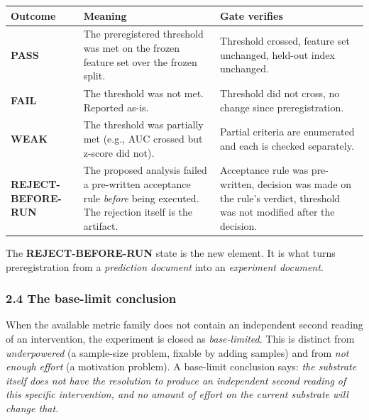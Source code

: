 \documentclass[
]{article}
\newcounter{none} %
\begin{document}
{\def\LTcaptype{none} %
\begin{longtable}[]{@{}
  >{\raggedright\arraybackslash}p{}
  >{\raggedright\arraybackslash}p{}
  >{\raggedright\arraybackslash}p{}@{}}
\toprule\noalign{}
\begin{minipage}[b]{\linewidth}\raggedright
Outcome
\end{minipage} & \begin{minipage}[b]{\linewidth}\raggedright
Meaning
\end{minipage} & \begin{minipage}[b]{\linewidth}\raggedright
Gate verifies
\end{minipage} \\
\midrule\noalign{}
\endhead
\bottomrule\noalign{}
\endlastfoot
\textbf{PASS} & The preregistered threshold was met on the frozen
feature set over the frozen split. & Threshold crossed, feature set
unchanged, held-out index unchanged. \\
\textbf{FAIL} & The threshold was not met. Reported as-is. & Threshold
did not cross, no change since preregistration. \\
\textbf{WEAK} & The threshold was partially met (e.g., AUC crossed but
z-score did not). & Partial criteria are enumerated and each is checked
separately. \\
\textbf{REJECT-BEFORE-RUN} & The proposed analysis failed a pre-written
acceptance rule \emph{before} being executed. The rejection itself is
the artifact. & Acceptance rule was pre-written, decision was made on
the rule's verdict, threshold was not modified after the decision. \\
\end{longtable}
}

The \textbf{REJECT-BEFORE-RUN} state is the new element. It is what
turns preregistration from a \emph{prediction document} into an
\emph{experiment document}.

\subsubsection{2.4 The base-limit
conclusion}\label{the-base-limit-conclusion}

When the available metric family does not contain an independent second
reading of an intervention, the experiment is closed as
\emph{base-limited}. This is distinct from \emph{underpowered} (a
sample-size problem, fixable by adding samples) and from \emph{not
enough effort} (a motivation problem). A base-limit conclusion says:
\emph{the substrate itself does not have the resolution to produce an
independent second reading of this specific intervention, and no amount
of effort on the current substrate will change that.}
\end{document}
